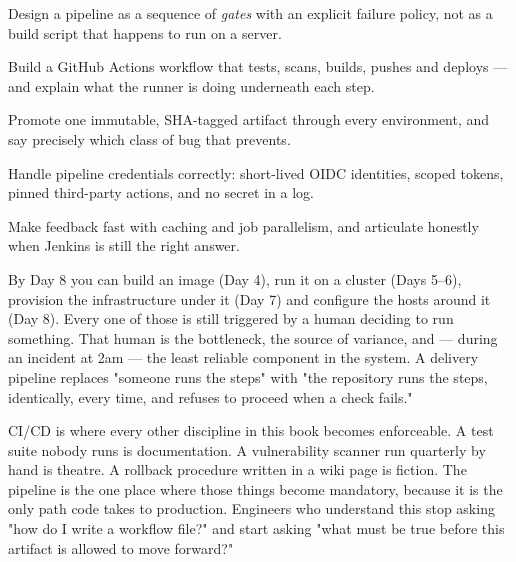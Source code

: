 
\begin{objectives}
\begin{wbitem}
  \item Design a pipeline as a sequence of \emph{gates} with an explicit failure policy, not as a build script that happens to run on a server.
  \item Build a GitHub Actions workflow that tests, scans, builds, pushes and deploys --- and explain what the runner is doing underneath each step.
  \item Promote one immutable, SHA-tagged artifact through every environment, and say precisely which class of bug that prevents.
  \item Handle pipeline credentials correctly: short-lived OIDC identities, scoped tokens, pinned third-party actions, and no secret in a log.
  \item Make feedback fast with caching and job parallelism, and articulate honestly when Jenkins is still the right answer.
\end{wbitem}
\end{objectives}


 By Day 8 you can build an image (Day 4), run it on a cluster (Days 5--6), provision the infrastructure under it (Day 7) and configure the hosts around it (Day 8). Every one of those is still triggered by a human deciding to run something. That human is the bottleneck, the source of variance, and --- during an incident at 2am --- the least reliable component in the system. A delivery pipeline replaces "someone runs the steps" with "the repository runs the steps, identically, every time, and refuses to proceed when a check fails."

 CI/CD is where every other discipline in this book becomes enforceable. A test suite nobody runs is documentation. A vulnerability scanner run quarterly by hand is theatre. A rollback procedure written in a wiki page is fiction. The pipeline is the one place where those things become mandatory, because it is the only path code takes to production. Engineers who understand this stop asking "how do I write a workflow file?" and start asking "what must be true before this artifact is allowed to move forward?"

